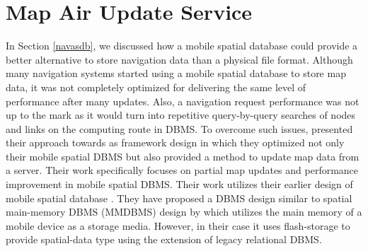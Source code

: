 \section{Map Air Update Service}\label{maus}
In Section \ref{navasdb}, we discussed how a mobile spatial database could provide a better alternative to store navigation data than a physical file format. Although many navigation systems started using a mobile spatial database to store map data, it was not completely optimized for delivering the same level of performance after many updates. Also, a navigation request performance was not up to the mark as it would turn into repetitive query-by-query searches of nodes and links on the computing route in DBMS. To overcome such issues, \citet{min2011system} presented their approach towards as framework design in which they optimized not only their mobile spatial DBMS but also provided a method to update map data from a server. Their work specifically focuses on partial map updates and performance improvement in mobile spatial DBMS. Their work utilizes their earlier design of mobile spatial database \cite{min2008mobile}. They have proposed a DBMS design similar to spatial main-memory DBMS (MMDBMS) design by \citet{yun2005development} which utilizes the main memory of a mobile device as a storage media. However, in their case it uses flash-storage to provide spatial-data type using the extension of legacy relational DBMS. \\

